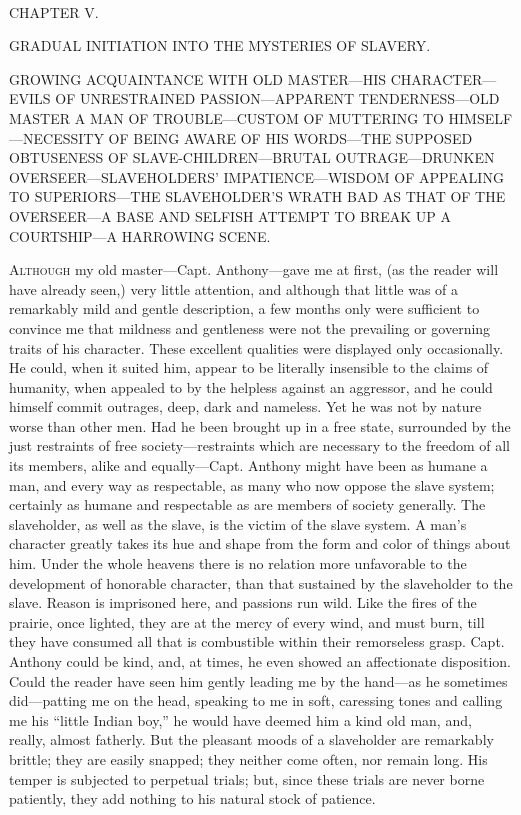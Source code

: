 {}

~

{CHAPTER V.}

GRADUAL INITIATION INTO THE MYSTERIES OF SLAVERY.

{GROWING ACQUAINTANCE WITH OLD MASTER---HIS CHARACTER---EVILS OF
UNRESTRAINED PASSION---APPARENT TENDERNESS---OLD MASTER A MAN OF
TROUBLE---CUSTOM OF MUTTERING TO HIMSELF---NECESSITY OF BEING AWARE OF
HIS WORDS---THE SUPPOSED OBTUSENESS OF SLAVE-CHILDREN---BRUTAL
OUTRAGE---DRUNKEN OVERSEER---SLAVEHOLDERS' IMPATIENCE---WISDOM OF
APPEALING TO SUPERIORS---THE SLAVEHOLDER'S WRATH BAD AS THAT OF THE
OVERSEER---A BASE AND SELFISH ATTEMPT TO BREAK UP A COURTSHIP---A
HARROWING SCENE.}

\textsc{Although} my old master---Capt. Anthony---gave me at first, (as
the reader will have already seen,) very little attention, and although
that little was of a remarkably mild and gentle description, a few
months only were sufficient to convince me that mildness and gentleness
were not the prevailing or governing traits of his character. These
excellent qualities were displayed only occasionally. He could, when it
suited him, appear to be literally insensible to the claims of humanity,
when appealed to by the helpless against an aggressor, and he could
himself commit outrages, deep, dark and nameless. Yet he was not by
nature worse than other men. Had he been brought up in a free state,
surrounded by the just restraints of free society---restraints which are
necessary to the freedom of all its members, alike and equally---Capt.
Anthony might have been as {}humane a man, and every way as respectable,
as many who now oppose the slave system; certainly as humane and
respectable as are members of society generally. The slaveholder, as
well as the slave, is the victim of the slave system. A man's character
greatly takes its hue and shape from the form and color of things about
him. Under the whole heavens there is no relation more unfavorable to
the development of honorable character, than that sustained by the
slaveholder to the slave. Reason is imprisoned here, and passions run
wild. Like the fires of the prairie, once lighted, they are at the mercy
of every wind, and must burn, till they have consumed all that is
combustible within their remorseless grasp. Capt. Anthony could be kind,
and, at times, he even showed an affectionate disposition. Could the
reader have seen him gently leading me by the hand---as he sometimes
did---patting me on the head, speaking to me in soft, caressing tones
and calling me his ``little Indian boy,'' he would have deemed him a
kind old man, and, really, almost fatherly. But the pleasant moods of a
slaveholder are remarkably brittle; they are easily snapped; they
neither come often, nor remain long. His temper is subjected to
perpetual trials; but, since these trials are never borne patiently,
they add nothing to his natural stock of patience.

